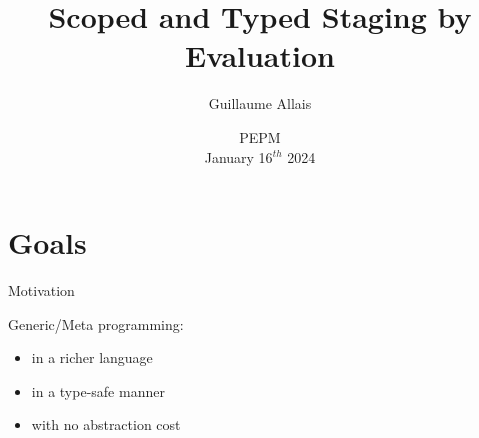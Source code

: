 \documentclass[aspectratio=169]{beamer}
\title{Scoped and Typed Staging by Evaluation}
\author{Guillaume Allais}
\institute{University of Strathclyde}
\date{PEPM \\ January 16$^{th}$ 2024}
\begin{document}
\begin{frame}
  \maketitle
\end{frame}

\section{Goals}

\begin{frame}{Motivation}



Generic/Meta programming:

\begin{itemize}
  \item in a richer language
  \item in a type-safe manner
  \item with no abstraction cost
\end{itemize}
\end{frame}
\end{document}

